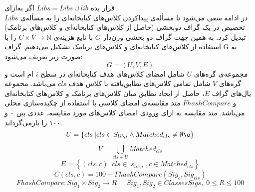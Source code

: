   قرار‌ بده $Libs = Libs \cup lib$
 ‌اگر
‌به‌ازای\\
 $Libs$
در ادامه سعی می‌شود تا مسأله‌ی پیداکردن کلاس‌های کتابخانه‌ای را به مسأله‌ی تخصیص در یک گراف دوبخشی (حاصل از کلاس‌های کتابخانه‌ای و کلاس‌های برنامک) تبدیل کرد. به همین جهت گراف دو بخشی وزن‌دار  $G$ با تابع هزینه‌ی
 $C\times  ٰV \rightarrow \mathbb{N}$ 
 را با استفاده از کلاس‌های کتابخانه‌ای و کلاس‌های برنامک تشکیل می‌دهیم. گراف G به صورت زیر تعریف می‌شود:
   \begin{equation}
 	G = (U,V,E)
 \end{equation}
 مجموعه‌ی گره‌های $U$ شامل امضای کلاس‌های هدف کتابخانه‌ای در سطح $i$ ام است و گره‌های $V$ شامل تمامی کلاس‌ها‌ی تطابق‌یافته با کلاس هدف $cls$ می‌باشد. مجموعه یال‌های گراف  $E$، حاصل از ایجاد تطابق میان‌ کلاس‌های برنامک و کلاس‌های کتابخانه‌ای و $FhashCompare$ متد مقایسه‌ی امضای کلاسی با استفاده از چکیده‌سازی محلی می‌باشد. متد مقایسه به ازای ورودی امضای کلاس‌های مورد مقایسه، عددی بین ۰ و ۱۰۰ را بازمی‌گرداند.
\begin{equation}
 	U = \left \{ cls \:| cls \in S_{lib,i} \wedge Matched_{cls} \neq \emptyset \o   \right \}
\end{equation}
\begin{equation}
	V = \bigcup_{cls \in U}^{} Matched_{cls}
\end{equation}
\begin{equation}
E= \left \{ (cls,c)\; | cls \in \; s_{lib,i} \; , c \in Matched_{cls} \right \}
\end{equation}
\begin{equation}
	C(cls,c) = 100 - FhashCompare(Sig_{c} , Sig_{cls})
\end{equation}
\begin{equation}
	FhashCompare: Sig_{1} \times Sig_{2} \rightarrow R \;\;\;\;\; Sig_{1} , Sig_{2} \in ClassesSigs, \; 0 \leq R \leq 100
\end{equation}

